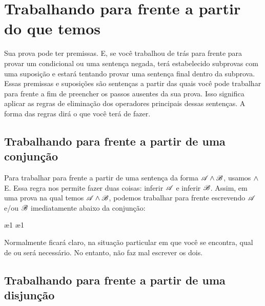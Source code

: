 \section{Trabalhando para frente a partir do que temos}

Sua prova pode ter premissas. E, se você trabalhou de trás para frente para provar um condicional ou uma sentença negada, terá estabelecido subprovas com uma suposição e estará tentando provar uma sentença final dentro da subprova. Essas premissas e suposições são sentenças a partir das quais você pode trabalhar para frente a fim de preencher os passos ausentes da sua prova. Isso significa aplicar as regras de eliminação dos operadores principais dessas sentenças. A forma das regras dirá o que você terá de fazer.

\subsection*{Trabalhando para frente a partir de uma conjunção}

Para trabalhar para frente a partir de uma sentença da forma $\mathscr{A} \wedge \mathscr{B}$, usamos $\wedge$E. Essa regra nos permite fazer duas coisas: inferir $\mathscr{A}$ e inferir $\mathscr{B}$. Assim, em uma prova na qual temos $\mathscr{A} \wedge \mathscr{B}$, podemos trabalhar para frente escrevendo $\mathscr{A}$ e/ou $\mathscr{B}$ imediatamente abaixo da conjunção:
\begin{fitchproof}
  \ae{1}
  \ae{1}
\end{fitchproof}
Normalmente ficará claro, na situação particular em que você se encontra, qual de  ou  será necessário. No entanto, não faz mal escrever os dois.

\subsection*{Trabalhando para frente a partir de uma disjunção}

